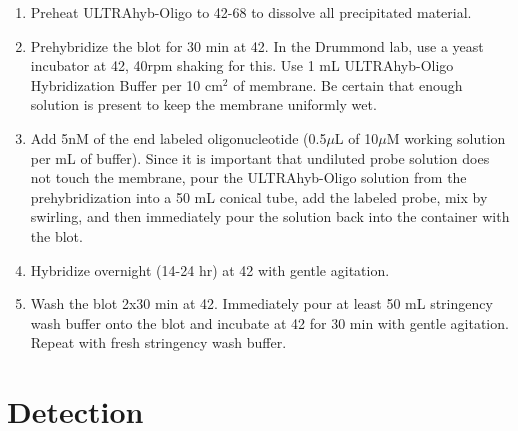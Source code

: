 \documentclass{article}
\newcommand{\mul}{\ensuremath{\mu}L\xspace}
\newcommand{\muM}{\ensuremath{\mu}M\xspace}
\newcommand{\degC}{\celsius\xspace}
\begin{document}
\begin{enumerate}[resume]
\item Preheat ULTRAhyb-Oligo to 42-68\degC to dissolve all precipitated material. \label{step:prehyb}
\item Prehybridize the blot for 30 min at 42\degC. In the Drummond lab, use a yeast incubator at 42\degC, 40rpm shaking for this.
Use 1 mL ULTRAhyb-Oligo Hybridization Buffer per 10 cm$^2$ of membrane. Be certain that enough solution is present to keep the membrane uniformly wet.
\item Add 5nM of the end labeled oligonucleotide (0.5\mul of 10\muM working solution per mL of buffer). 
Since it is important that undiluted probe solution does not touch the membrane, pour the ULTRAhyb-Oligo solution from the prehybridization into a 50 mL conical tube, add the labeled probe, mix by swirling, and then immediately pour the solution back into the container with the blot.
\item Hybridize overnight (14-24 hr) at 42\degC with gentle agitation.
\item Wash the blot 2x30 min at 42\degC. Immediately pour at least 50 mL stringency wash buffer onto the blot and incubate at 42\degC for 30 min with gentle agitation. Repeat with fresh stringency wash buffer.
\end{enumerate}

\section*{Detection}
\label{sec:detect}

\end{document}
